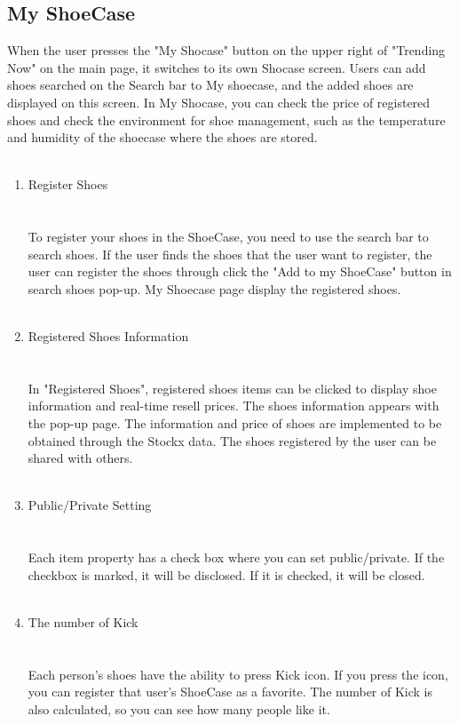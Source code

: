 \documentclass[conference]{IEEEtran}
\begin{document}
\subsection{My ShoeCase}
When the user presses the "My Shocase" button on the upper right of "Trending Now" on the main page, it switches to its own Shocase screen. Users can add shoes searched on the Search bar to My shoecase, and the added shoes are displayed on this screen. In My Shocase, you can check the price of registered shoes and check the environment for shoe management, such as the temperature and humidity of the shoecase where the shoes are stored.\\\\
\begin{enumerate}
	\item Register Shoes\\\\
\\To register your shoes in the ShoeCase, you need to use the search bar to search shoes. If the user finds the shoes that the user want to register, the user can register the shoes through click the "Add to my ShoeCase" button in search shoes pop-up. My Shoecase page display the registered shoes.\\\\
	
	\item Registered Shoes Information\\\\
\\In "Registered Shoes", registered shoes items can be clicked to display shoe information and real-time resell prices. The shoes information appears with the pop-up page.
The information and price of shoes are implemented to be obtained through the Stockx data. The shoes registered by the user can be shared with others.\\\\
	\item Public/Private Setting\\\\
\\Each item property has a check box where you can set public/private. 
If the checkbox is marked, it will be disclosed. If it is checked, it will be closed.\\\\
	\item The number of Kick\\\\
\\Each person's shoes have the ability to press Kick icon. 
If you press the icon, you can register that user's ShoeCase as a favorite.
The number of Kick is also calculated, so you can see how many people like it.\\\\
\end{enumerate}
\end{document}
